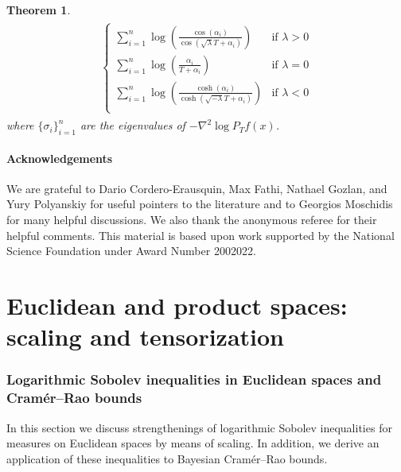 \documentclass[a4paper,twoside,11pt,reqno]{amsart}
\newtheorem{theorem}{Theorem}
\begin{document}
\begin{theorem}
\begin{align}
\begin{split}
\begin{cases}
\sum_{i=1}^n\log\left(\frac{\cos (\alpha_i)}{\cos(\sqrt{\lambda}T+\alpha_i)}\right)&\text{if }\lambda>0\\
\sum_{i=1}^n\log\left(\frac{\alpha_i}{T+\alpha_i}\right) &\text{if }\lambda=0\\
\sum_{i=1}^n\log\left(\frac{\cosh (\alpha_i)}{\cosh(\sqrt{-\lambda}T+\alpha_i)}\right) &\text{if }\lambda<0\\
\end{cases}
\end{split}
\end{align}
where $\{\sigma_i\}_{i=1}^n$ are the eigenvalues of $-\nabla^2\log P_Tf(x)$.
\end{theorem}

\medskip

\subsection*{Acknowledgements} We are grateful to Dario Cordero-Erausquin,  Max Fathi, Nathael Gozlan, and Yury Polyanskiy for useful pointers to the literature and to  Georgios Moschidis for many helpful discussions. We also thank the anonymous referee for their helpful comments. This material is based upon work supported by the National
Science Foundation under Award Number 2002022.


\part{Euclidean and product spaces: scaling and tensorization}


\section{Logarithmic Sobolev inequalities in Euclidean spaces and Cram\'er--Rao bounds} \label{sec:lsi}

In this  section we discuss strengthenings of logarithmic Sobolev inequalities for measures on Euclidean spaces by means of scaling. In addition, we derive an application of these inequalities to Bayesian Cram\'er--Rao bounds.
\end{document}
